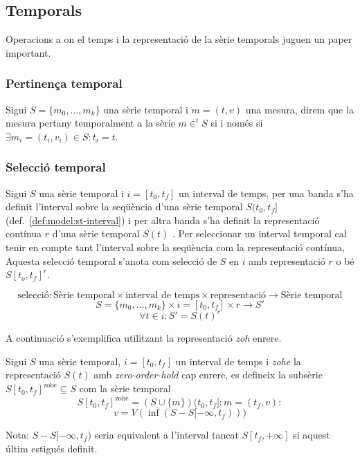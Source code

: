 \subsection{Temporals}

Operacions a on el temps i la representació de la sèrie temporals
juguen un paper important.


\subsubsection{Pertinença temporal}

\begin{definition}
  Sigui $S=\{m_0, \dotsc, m_{k}\}$ una sèrie temporal i $m=(t,v)$ una
  mesura, direm que la mesura pertany temporalment a la sèrie 
  $m\in^t S$ si i només si $\exists m_i=(t_i,v_i)\in S: t_i=t$.
\end{definition}



\subsubsection{Selecció temporal}

Sigui $S$ una sèrie temporal i $i=[t_0,t_f]$ un interval de temps,
per una banda s'ha definit l'interval sobre la seqüència d'una sèrie temporal $S(t_0,t_f]$ (def.~\ref{def:model:st-interval})  i per altra banda s'ha definit la representació contínua $r$ d'una sèrie temporal $S(t)$ .
Per seleccionar un interval temporal cal tenir en compte tant l'interval sobre la seqüència com la representació contínua, Aquesta selecció temporal s'anota com selecció de $S$ en $i$ amb representació $r$ o bé $S[t_o,t_f]^r$. 

\begin{definition}
  \[
  \text{selecció}: \text{Sèrie temporal} \times \text{interval de
    temps} \times \text{representació} \longrightarrow \text{Sèrie
    temporal}
  \]
  \[
  S = \{m_0 , \ldots , m_k\}  \times i = [t_0,t_f] \times r \longrightarrow S'
  \]
  \[
  \forall  t \in i: S' = S(t)^r 
  \] 
\end{definition}

A continuació s'exemplifica utilitzant la representació \emph{zoh} enrere.


\begin{definition}
  Sigui $S$ una sèrie temporal, $i=[t_0,t_f]$ un interval de temps i
  \emph{zohe} la representació $S(t)$ amb \emph{zero-order-hold} cap
  enrere, es defineix la subsèrie $S[t_0,t_f]^{\text{zohe}}\subseteq
  S$ com la sèrie temporal 
  \[
  S[t_0,t_f]^{\text{zohe}} = (S \cup \{m\})(t_0,t_f] : m=(t_f,v):
  \]
  \[
  v=  V(\inf(S-S[-\infty,t_f)))
  \]
  
  Nota: $S-S[-\infty,t_f)$ seria equivalent a l'interval tancat
  $S[t_f,+\infty]$ si aquest últim estigués definit.
\end{definition}

